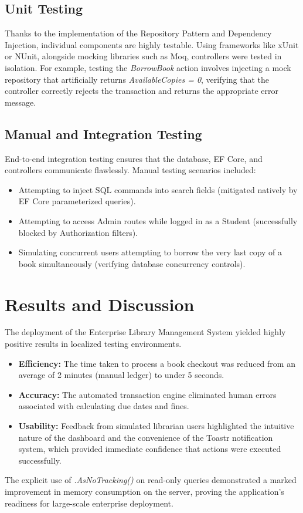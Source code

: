\documentclass[conference]{IEEEtran}
\begin{document}
\subsection{Unit Testing}
Thanks to the implementation of the Repository Pattern and Dependency Injection, individual components are highly testable. Using frameworks like xUnit or NUnit, alongside mocking libraries such as Moq, controllers were tested in isolation. For example, testing the \textit{BorrowBook} action involves injecting a mock repository that artificially returns \textit{AvailableCopies = 0}, verifying that the controller correctly rejects the transaction and returns the appropriate error message.

\subsection{Manual and Integration Testing}
End-to-end integration testing ensures that the database, EF Core, and controllers communicate flawlessly. Manual testing scenarios included:
\begin{itemize}
    \item Attempting to inject SQL commands into search fields (mitigated natively by EF Core parameterized queries).
    \item Attempting to access Admin routes while logged in as a Student (successfully blocked by Authorization filters).
    \item Simulating concurrent users attempting to borrow the very last copy of a book simultaneously (verifying database concurrency controls).
\end{itemize}

\section{Results and Discussion}
The deployment of the Enterprise Library Management System yielded highly positive results in localized testing environments.
\begin{itemize}
    \item \textbf{Efficiency:} The time taken to process a book checkout was reduced from an average of 2 minutes (manual ledger) to under 5 seconds.
    \item \textbf{Accuracy:} The automated transaction engine eliminated human errors associated with calculating due dates and fines.
    \item \textbf{Usability:} Feedback from simulated librarian users highlighted the intuitive nature of the dashboard and the convenience of the Toastr notification system, which provided immediate confidence that actions were executed successfully.
\end{itemize}
The explicit use of \textit{.AsNoTracking()} on read-only queries demonstrated a marked improvement in memory consumption on the server, proving the application's readiness for large-scale enterprise deployment.
\end{document}
